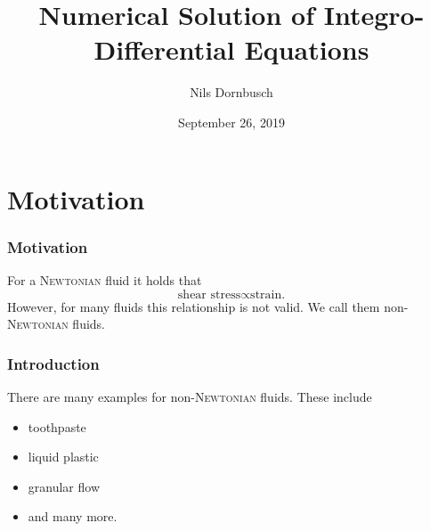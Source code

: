\documentclass[12pt,a4paper,handout]{beamer}
\theoremstyle{definition}
\theoremstyle{plain}
\begin{document}
    \title{Numerical Solution of Integro-Differential Equations}
    \author{Nils Dornbusch}
    \date{September 26, 2019}
    \maketitle
   
\section{Motivation}
\begin{frame}
    \frametitle{Motivation}
    For a \textsc{Newtonian} fluid it holds that
    \begin{equation*}
        \text{shear stress} \propto \text{strain.}
    \end{equation*}
    However, for many fluids this relationship is not valid. We call them non-\textsc{Newtonian} fluids.
\end{frame}
\begin{frame}
     \frametitle{Introduction}
    There are many examples for non-\textsc{Newtonian} fluids. These include
    \begin{itemize}[<+->]
        \item toothpaste
        \item liquid plastic
        \item granular flow
        \item and many more.
    \end{itemize}
\end{frame}
\end{document}
